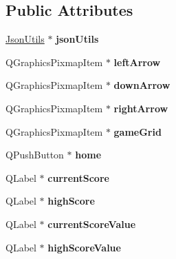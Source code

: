 \subsection*{Public Attributes}
\begin{DoxyCompactItemize}
\item 
\mbox{\label{classGame2GamePage_ad178faec136c597e859829c694b03655}} 
\hyperlink{classJsonUtils}{Json\+Utils} $\ast$ {\bfseries json\+Utils}
\item 
\mbox{\label{classGame2GamePage_a6b64b11465445ff6e1817cd1fac5fa75}} 
Q\+Graphics\+Pixmap\+Item $\ast$ {\bfseries left\+Arrow}
\item 
\mbox{\label{classGame2GamePage_a50d056d4d658c461a6914cf50addc555}} 
Q\+Graphics\+Pixmap\+Item $\ast$ {\bfseries down\+Arrow}
\item 
\mbox{\label{classGame2GamePage_a305c76c41cabd0f189ef05360171994c}} 
Q\+Graphics\+Pixmap\+Item $\ast$ {\bfseries right\+Arrow}
\item 
\mbox{\label{classGame2GamePage_ac60280fca45fb0cdaa9a64f6272ad444}} 
Q\+Graphics\+Pixmap\+Item $\ast$ {\bfseries game\+Grid}
\item 
\mbox{\label{classGame2GamePage_ac35237480af9371904711b8f3074b728}} 
Q\+Push\+Button $\ast$ {\bfseries home}
\item 
\mbox{\label{classGame2GamePage_a22fb0504a2fdf6cb8d435aac1b63d9cd}} 
Q\+Label $\ast$ {\bfseries current\+Score}
\item 
\mbox{\label{classGame2GamePage_a710bd1c9f2abad1c198db528dff9fc86}} 
Q\+Label $\ast$ {\bfseries high\+Score}
\item 
\mbox{\label{classGame2GamePage_a375dfeacd19165b7eb0d1c1d285d976c}} 
Q\+Label $\ast$ {\bfseries current\+Score\+Value}
\item 
\mbox{\label{classGame2GamePage_a398aa7f46758514f9460cb5af5ec3f05}} 
Q\+Label $\ast$ {\bfseries high\+Score\+Value}
\item 

\end{DoxyCompactItemize}
